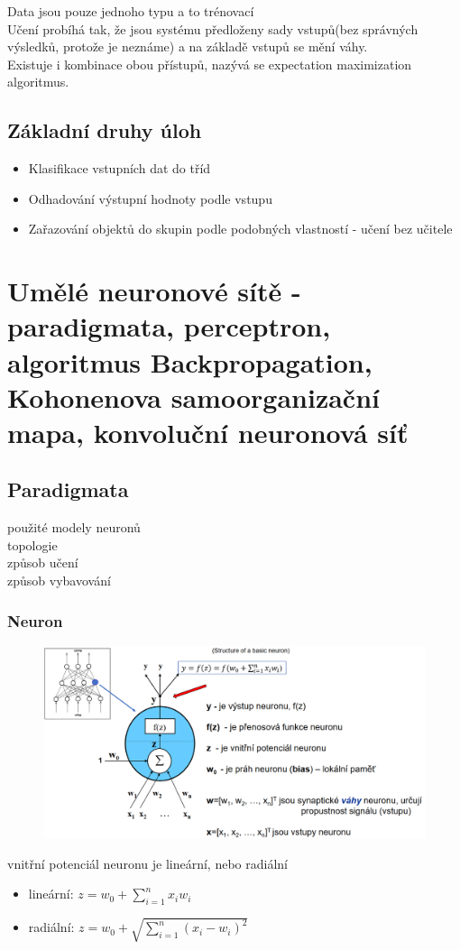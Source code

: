 Data jsou pouze jednoho typu a to trénovací\\
Učení probíhá tak, že jsou systému předloženy sady vstupů(bez správných výsledků, protože je neznáme) a na základě vstupů se mění váhy.\\

Existuje i kombinace obou přístupů, nazývá se expectation maximization algoritmus.

\subsection*{Základní druhy úloh}
\begin{itemize}
    \item Klasifikace vstupních dat do tříd
    \item Odhadování výstupní hodnoty podle vstupu
    \item Zařazování objektů do skupin podle podobných vlastností - učení bez učitele
\end{itemize}

\section{Umělé neuronové sítě - paradigmata, perceptron, algoritmus Backpropagation, Kohonenova samoorganizační mapa, konvoluční neuronová síť}
\subsection*{Paradigmata}
použité modely neuronů\\
topologie\\
způsob učení\\
způsob vybavování\\

\subsubsection*{Neuron}
\begin{figure}[H]
    \includegraphics[scale = 0.5]{images/neuron.png}
\end{figure}
vnitřní potenciál neuronu je lineární, nebo radiální
\begin{itemize}
    \item lineární: $z = w_0 + \sum^n_{i=1}x_iw_i$
    \item radiální: $z = w_0 + \sqrt{\sum^n_{i=1}(x_i-w_i)^2}$
\end{itemize}

